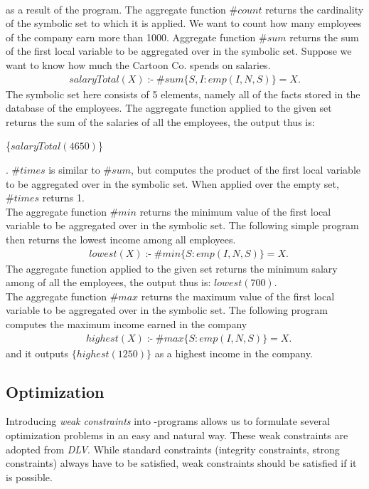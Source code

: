 \documentclass[14pt,a4paper, titlepage]{article}
\DeclareMathOperator{\leftimpl}{:-}
\begin{document}
\\as a result of the program.
The aggregate function $\mathit{\#count}$ returns the 
cardinality of the symbolic set to which it is applied. We 
want to count how many employees of the company earn more 
than 1000. 
\bigskip Aggregate function $\mathit{\#sum}$ returns the 
sum of the first local variable to be aggregated over in 
the symbolic set. Suppose we want to know how much the 
Cartoon Co. spends on salaries.
\begin{align*}
\mathit{salaryTotal(X)} \leftimpl \mathit{\#sum}\{S,I : 
\mathit{emp(I,N,S)}\} = X.
\end{align*}
The symbolic set here consists of 5 elements, namely all of 
the facts stored in the database of the employees. The 
aggregate function applied to the given set returns the sum 
of the salaries of all the employees, the output thus is: 
\\ \centerline{
\{$\mathit{salaryTotal(4650)}$\}}. $\mathit{\#times}$ is 
similar to $\mathit{\#sum}$, but computes the product of 
the first local variable to be aggregated over in the 
symbolic set. When applied over the empty set, 
$\mathit{\#times}$ returns 1.
\bigskip \\The aggregate function $\mathit{\#min}$ returns 
the minimum value of the first local variable to be 
aggregated over in the symbolic set. The following simple 
program then returns the lowest income among all employees.
\begin{align*}
& lowest(X) \leftimpl \#min\{S : emp(I,N,S)\} = X.
\end{align*}
The aggregate function applied to the given set returns the 
minimum salary among of all the employees, the output thus 
is:
{$\mathit{lowest(700)}$}.
\bigskip \\The aggregate function $\mathit{\#max}$ returns 
the maximum value of the first local variable to be 
aggregated over in the symbolic set. The following program 
computes the maximum income earned in the company
\begin{align*}
& \mathit{highest}(X) \leftimpl \mathit{\#max}\{S : 
\mathit{emp}(I,N,S)\} = X.
\end{align*}
and it outputs $\{highest(1250)\}$ as a highest income in 
the company.

\subsection{Optimization}
\label{optimize}
Introducing \emph{weak constraints} into \hex-programs 
allows us to formulate several optimization problems in an 
easy and natural way. These weak constraints are adopted 
from \emph{DLV}. While standard constraints (integrity 
constraints, strong constraints) always have to be 
satisfied, weak constraints should be satisfied if it is 
possible.
\end{document}

